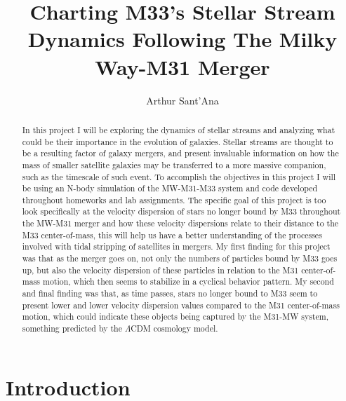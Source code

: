 \documentclass[linenumbers,trackchanges,twocolumn]{aastex7}
\begin{document}
\title{Charting M33's Stellar Stream Dynamics Following The Milky Way-M31 Merger}

 

\author{Arthur Sant'Ana}




\begin{abstract}
    In this project I will be exploring the dynamics of stellar streams and analyzing what could be their importance in the evolution of galaxies. Stellar streams are thought to be a resulting factor of galaxy mergers, and present invaluable information on how the mass of smaller satellite galaxies may be transferred to a more massive companion, such as the timescale of such event. To accomplish the objectives in this project I will be using an N-body simulation of the MW-M31-M33 system and code developed throughout homeworks and lab assignments. The specific goal of this project is too look specifically at the velocity dispersion of stars no longer bound by M33 throughout the MW-M31 merger and how these velocity dispersions relate to their distance to the M33 center-of-mass, this will help us have a better understanding of the processes involved with tidal stripping of satellites in mergers. My first finding for this project was that as the merger goes on, not only the numbers of particles bound by M33 goes up, but also the velocity dispersion of these particles in relation to the M31 center-of-mass motion, which then seems to stabilize in a cyclical behavior pattern. My second and final finding was that, as time passes, stars no longer bound to M33 seem to present lower and lower velocity dispersion values compared to the M31 center-of-mass motion, which could indicate these objects being captured by the M31-MW system, something predicted by the $\Lambda$CDM cosmology model.
\end{abstract}




\section{Introduction} \label{sec:introduction}
\end{document}

